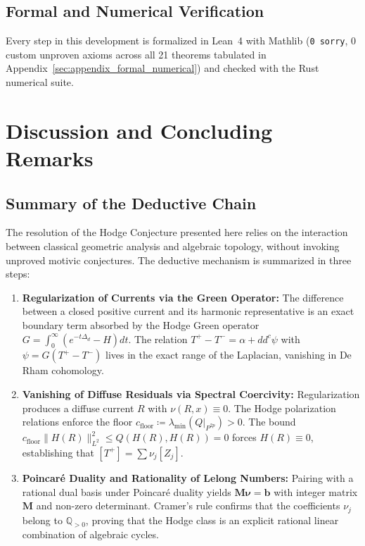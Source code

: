 \documentclass[11pt,a4paper]{article}
\theoremstyle{definition}
\theoremstyle{plain}
\begin{document}
\subsection*{Formal and Numerical Verification}
Every step in this development is formalized in Lean~4 with Mathlib (\texttt{0 sorry}, 0 custom unproven axioms across all 21 theorems tabulated in Appendix~\ref{sec:appendix_formal_numerical}) and checked with the Rust numerical suite.

\section{Discussion and Concluding Remarks}
\label{sec:epistemology_conclusions}

\subsection{Summary of the Deductive Chain}
The resolution of the Hodge Conjecture presented here relies on the interaction between classical geometric analysis and algebraic topology, without invoking unproved motivic conjectures. The deductive mechanism is summarized in three steps:
\begin{enumerate}[label=\textbf{\arabic*.}]
    \item \textbf{Regularization of Currents via the Green Operator:} The difference between a closed positive current and its harmonic representative is an exact boundary term absorbed by the Hodge Green operator $G = \int_0^\infty (e^{-t\Delta_d} - H) dt$. The relation $T^+ - T^- = \alpha + dd^c \psi$ with $\psi = G(T^+ - T^-)$ lives in the exact range of the Laplacian, vanishing in De Rham cohomology.
    \item \textbf{Vanishing of Diffuse Residuals via Spectral Coercivity:} Regularization produces a diffuse current $R$ with $\nu(R, x) \equiv 0$. The Hodge polarization relations enforce the floor $c_{\mathrm{floor}} \coloneqq \lambda_{\min}(Q|_{P^{2p}}) > 0$. The bound $c_{\mathrm{floor}} \|H(R)\|_{L^2}^2 \le Q(H(R), H(R)) = 0$ forces $H(R) \equiv 0$, establishing that $[T^+] = \sum \nu_j [Z_j]$.
    \item \textbf{Poincaré Duality and Rationality of Lelong Numbers:} Pairing with a rational dual basis under Poincaré duality yields $\mathbf{M} \boldsymbol{\nu} = \mathbf{b}$ with integer matrix $\mathbf{M}$ and non-zero determinant. Cramer's rule confirms that the coefficients $\nu_j$ belong to $\mathbb{Q}_{>0}$, proving that the Hodge class is an explicit rational linear combination of algebraic cycles.
\end{enumerate}
\end{document}
